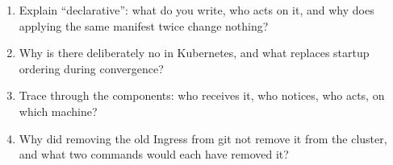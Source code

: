 \begin{quiz}
\begin{enumerate}
  \item Explain ``declarative'': what do you write, who acts on it, and
  why does applying the same manifest twice change nothing?
  \item Why is there deliberately no  in Kubernetes,
  and what replaces startup ordering during convergence?
  \item Trace  through the
  components: who receives it, who notices, who acts, on which machine?
  \item Why did removing the old Ingress from git not remove it from
  the cluster, and what two commands would each have removed it?
\end{enumerate}
\end{quiz}
